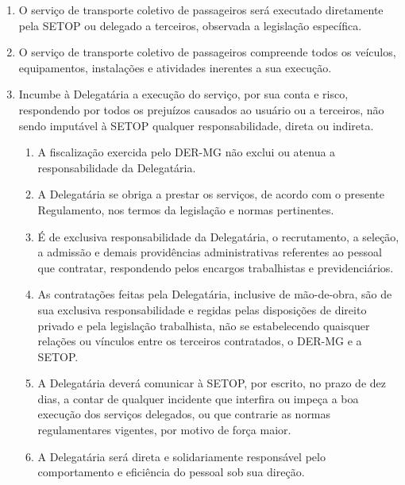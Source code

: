 \begin{enumerate}[resume, label=Art. \arabic*]

\item  O serviço de transporte coletivo de passageiros será executado diretamente pela SETOP ou delegado a terceiros, observada a legislação específica.

\item O serviço de transporte coletivo de passageiros compreende todos os veículos, equipamentos, instalações e atividades inerentes a sua execução.

\item Incumbe à Delegatária a execução do serviço, por sua conta e risco, respondendo por todos os prejuízos causados ao usuário ou a terceiros, não sendo imputável à SETOP qualquer responsabilidade, direta ou indireta.

\begin{enumerate}[label= \S \arabic*] %

\item A fiscalização exercida pelo DER-MG não exclui ou atenua a responsabilidade da Delegatária.

\item A Delegatária se obriga a prestar os serviços, de acordo com o presente Regulamento, nos termos da legislação e normas pertinentes.

\item É de exclusiva responsabilidade da Delegatária, o recrutamento, a seleção, a admissão e demais providências administrativas referentes ao pessoal que contratar, respondendo pelos encargos trabalhistas e previdenciários.

\item As contratações feitas pela Delegatária, inclusive de mão-de-obra, são de sua exclusiva responsabilidade e regidas pelas disposições de direito privado e pela legislação trabalhista, não se estabelecendo quaisquer relações ou vínculos entre os terceiros contratados, o DER-MG e a SETOP.

\item A Delegatária deverá comunicar à SETOP, por escrito, no prazo de dez dias, a contar de qualquer incidente que interfira ou impeça a boa execução dos serviços delegados, ou que contrarie as normas regulamentares vigentes, por motivo de força maior.

\item A Delegatária será direta e solidariamente responsável pelo comportamento e eficiência do pessoal sob sua direção.


\end{enumerate}
\end{enumerate}
